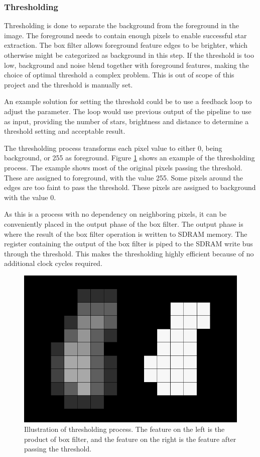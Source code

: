 \documentclass[12pt]{report}
\begin{document}
\subsubsection{Thresholding}
Thresholding is done to separate the background from the foreground in the image. The foreground needs to contain enough pixels to enable successful star extraction. The box filter allows foreground feature edges to be brighter, which otherwise might be categorized as background in this step. If the threshold is too low, background and noise blend together with foreground features, making the choice of optimal threshold a complex problem. This is out of scope of this project and the threshold is manually set.
\par
An example solution for setting the threshold could be to use a feedback loop to adjust the parameter. The loop would use previous output of the pipeline to use as input, providing the number of stars, brightness and distance to determine a threshold setting and acceptable result.
\par
The thresholding process transforms each pixel value to either 0, being background, or 255 as foreground. Figure \ref*{fig:thresholding} shows an example of the thresholding process. The example shows most of the original pixels passing the threshold. These are assigned to foreground, with the value 255. Some pixels around the edges are too faint to pass the threshold. These pixels are assigned to background with the value 0. \citep{stpp}
\par
 As this is a process with no dependency on neighboring pixels, it can be conveniently placed in the output phase of the box filter. The output phase is where the result of the box filter operation is written to SDRAM memory. The register containing the output of the box filter is piped to the SDRAM write bus through the threshold. This makes the thresholding highly efficient because of no additional clock cycles required. \citep{stpp}

\begin{figure}[h]
    \centering
    \includegraphics[scale=0.25]{figures/thresholding.png}
    \caption{Illustration of thresholding process. The feature on the left is the product of box filter, and the feature on the right is the feature after passing the threshold.}
    \label{fig:thresholding}
\end{figure}
\end{document}
